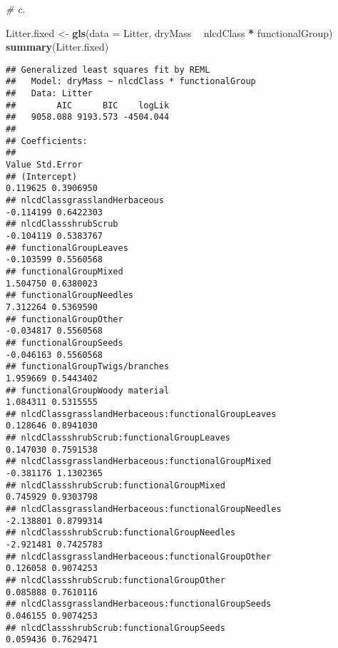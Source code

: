 \documentclass[]{article}
\newenvironment{Shaded}{\begin{snugshade}}{\end{snugshade}}
\newcommand{\KeywordTok}[1]{\textcolor[rgb]{0.13,0.29,0.53}{\textbf{#1}}}
\newcommand{\DataTypeTok}[1]{\textcolor[rgb]{0.13,0.29,0.53}{#1}}
\newcommand{\StringTok}[1]{\textcolor[rgb]{0.31,0.60,0.02}{#1}}
\newcommand{\CommentTok}[1]{\textcolor[rgb]{0.56,0.35,0.01}{\textit{#1}}}
\newcommand{\OperatorTok}[1]{\textcolor[rgb]{0.81,0.36,0.00}{\textbf{#1}}}
\newcommand{\NormalTok}[1]{#1}
\begin{document}
\begin{Shaded}
\begin{Highlighting}[]
\CommentTok{# c. }

\NormalTok{Litter.fixed <-}\StringTok{ }\KeywordTok{gls}\NormalTok{(}\DataTypeTok{data =}\NormalTok{ Litter,}
\NormalTok{                      dryMass }\OperatorTok{~}\StringTok{ }\NormalTok{nlcdClass }\OperatorTok{*}\StringTok{ }\NormalTok{functionalGroup)}
\KeywordTok{summary}\NormalTok{(Litter.fixed)}
\end{Highlighting}
\end{Shaded}

\begin{verbatim}
## Generalized least squares fit by REML
##   Model: dryMass ~ nlcdClass * functionalGroup 
##   Data: Litter 
##        AIC      BIC    logLik
##   9058.088 9193.573 -4504.044
## 
## Coefficients:
##                                                                Value Std.Error
## (Intercept)                                                 0.119625 0.3906950
## nlcdClassgrasslandHerbaceous                               -0.114199 0.6422303
## nlcdClassshrubScrub                                        -0.104119 0.5383767
## functionalGroupLeaves                                      -0.103599 0.5560568
## functionalGroupMixed                                        1.504750 0.6380023
## functionalGroupNeedles                                      7.312264 0.5369590
## functionalGroupOther                                       -0.034817 0.5560568
## functionalGroupSeeds                                       -0.046163 0.5560568
## functionalGroupTwigs/branches                               1.959669 0.5443402
## functionalGroupWoody material                               1.084311 0.5315555
## nlcdClassgrasslandHerbaceous:functionalGroupLeaves          0.128646 0.8941030
## nlcdClassshrubScrub:functionalGroupLeaves                   0.147030 0.7591538
## nlcdClassgrasslandHerbaceous:functionalGroupMixed          -0.381176 1.1302365
## nlcdClassshrubScrub:functionalGroupMixed                    0.745929 0.9303798
## nlcdClassgrasslandHerbaceous:functionalGroupNeedles        -2.138801 0.8799314
## nlcdClassshrubScrub:functionalGroupNeedles                 -2.921481 0.7425783
## nlcdClassgrasslandHerbaceous:functionalGroupOther           0.126058 0.9074253
## nlcdClassshrubScrub:functionalGroupOther                    0.085888 0.7610116
## nlcdClassgrasslandHerbaceous:functionalGroupSeeds           0.046155 0.9074253
## nlcdClassshrubScrub:functionalGroupSeeds                    0.059436 0.7629471

\end{verbatim}
\end{document}
